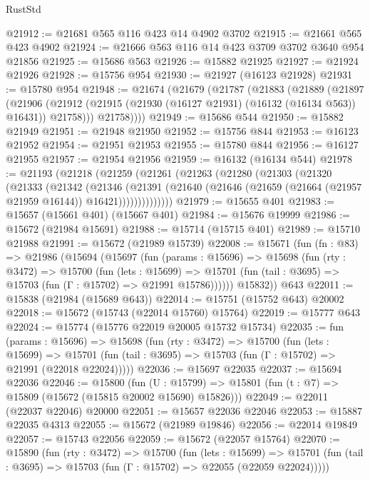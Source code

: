 \begin{lexlean}{RustStd}
\begin{coremodule}
@21912 := @21681 @565 @116 @423 @14 @4902 @3702
@21915 := @21661 @565 @423 @4902
@21924 := @21666 @563 @116 @14 @423 @3709 @3702 @3640 @954 @21856
@21925 := @15686 @563
@21926 := @15882 @21925
@21927 := @21924 @21926
@21928 := @15756 @954
@21930 := @21927 (@16123 @21928)
@21931 := @15780 @954
@21948 := @21674
    (@21679
      (@21787
        (@21883
          (@21889
            (@21897
              (@21906
                (@21912 (@21915 (@21930 (@16127 @21931) (@16132 (@16134 @563)) @16431)) @21758)))
            @21758))))
@21949 := @15686 @544
@21950 := @15882 @21949
@21951 := @21948 @21950
@21952 := @15756 @844
@21953 := @16123 @21952
@21954 := @21951 @21953
@21955 := @15780 @844
@21956 := @16127 @21955
@21957 := @21954 @21956
@21959 := @16132 (@16134 @544)
@21978 := @21193
    (@21218
      (@21259
        (@21261
          (@21263
            (@21280
              (@21303
                (@21320
                  (@21333
                    (@21342
                      (@21346
                        (@21391
                          (@21640
                            (@21646 (@21659 (@21664 (@21957 @21959 @16144)) @16421))))))))))))))
@21979 := @15655 @401
@21983 := @15657 (@15661 @401) (@15667 @401)
@21984 := @15676 @19999
@21986 := @15672 (@21984 @15691)
@21988 := @15714 (@15715 @401)
@21989 := @15710 @21988
@21991 := @15672 (@21989 @15739)
@22008 := @15671
    (fun (fn : @83) =>
    @21986
      (@15694
        (@15697
          (fun (params : @15696) =>
          @15698
            (fun (rty : @3472) =>
            @15700
              (fun (lets : @15699) =>
              @15701 (fun (tail : @3695) => @15703 (fun (Γ : @15702) => @21991 @15786))))))
        @15832))
    @643
@22011 := @15838 (@21984 (@15689 @643))
@22014 := @15751 (@15752 @643) @20002
@22018 := @15672 (@15743 (@22014 @15760) @15764)
@22019 := @15777 @643
@22024 := @15774 (@15776 @22019 @20005 @15732 @15734)
@22035 := fun (params : @15696) =>
  @15698
    (fun (rty : @3472) =>
    @15700
      (fun (lets : @15699) =>
      @15701 (fun (tail : @3695) => @15703 (fun (Γ : @15702) => @21991 (@22018 @22024)))))
@22036 := @15697 @22035
@22037 := @15694 @22036
@22046 := @15800
    (fun (U : @15799) => @15801 (fun (t : @7) => @15809 (@15672 (@15815 @20002 @15690) @15826)))
@22049 := @22011 (@22037 @22046) @20000
@22051 := @15657 @22036 @22046
@22053 := @15887 @22035 @4313
@22055 := @15672 (@21989 @19846)
@22056 := @22014 @19849
@22057 := @15743 @22056
@22059 := @15672 (@22057 @15764)
@22070 := @15890
    (fun (rty : @3472) =>
    @15700
      (fun (lets : @15699) =>
      @15701 (fun (tail : @3695) => @15703 (fun (Γ : @15702) => @22055 (@22059 @22024)))))

\end{coremodule}
\end{lexlean}
